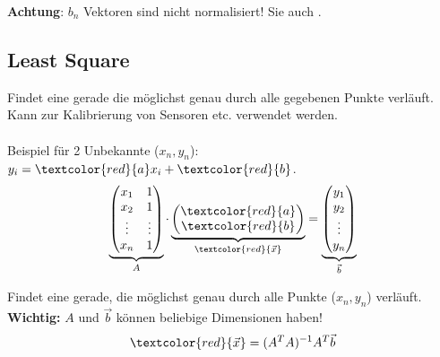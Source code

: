 \noindent \textbf{Achtung}: $b_n$ Vektoren sind nicht normalisiert! Sie auch .

\subsection{Least Square}\label{leastsquare}
Findet eine gerade die möglichst genau durch alle gegebenen Punkte verläuft. Kann zur Kalibrierung von Sensoren etc. verwendet werden. \\ \\
\noindent
Beispiel für 2 Unbekannte ($x_n, y_n$): $y_i = \textcolor{red}{a}x_i + \textcolor{red}{b}$.
\[
	\underbrace{\begin{pmatrix}
			x_1 & 1 \\
			x_2 & 1 \\
			\vdots & \vdots \\
			x_n & 1
		\end{pmatrix}}_{\scriptsize{A}}
	\cdot
	\underbrace{\begin{pmatrix}
			\textcolor{red}{a} \\
			\textcolor{red}{b}
		\end{pmatrix}}_{\scriptsize{\textcolor{red}{\vec{x}}}}
	=
	\underbrace{\begin{pmatrix}
		y_1 \\
		y_2 \\
		\vdots \\
		y_n
	\end{pmatrix}}_{\scriptsize{\vec{b}}}
\]

\noindent
Findet eine gerade, die möglichst genau durch alle Punkte ($x_n, y_n$) verläuft. \textbf{Wichtig:} $A$ und $\vec{b}$ können beliebige Dimensionen haben!
\[\textcolor{red}{\vec{x}} = (A^TA)^{-1}A^T\vec{b}\]
